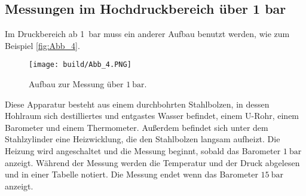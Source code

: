 \subsection{Messungen im Hochdruckbereich über 1 bar} %
\label{sub:M_Hochdruckbereich}
Im Druckbereich ab \qty{1}{\bar} muss ein anderer Aufbau benutzt werden, wie zum Beispiel \autoref{fig:Abb_4}.
\begin{figure}[H]
    \centering
    \texttt{[image: build/Abb\_4.PNG]}
    \caption {Aufbau zur Messung über $\qty{1}{\bar}$.\cite{V203}}
    \label{fig:Abb_4}
\end{figure}
Diese Apparatur besteht aus einem durchbohrten Stahlbolzen, in dessen Hohlraum sich destilliertes und entgastes Wasser befindet,
einem U-Rohr, einem Barometer und einem Thermometer.
Außerdem befindet sich unter dem Stahlzylinder eine Heizwicklung, die den Stahlbolzen langsam aufheizt.
Die Heizung wird angeschaltet und die Messung beginnt, sobald das Barometer $\qty{1}{\bar}$ anzeigt.
Während der Messung werden die Temperatur und der Druck abgelesen und in einer Tabelle notiert.
Die Messung endet wenn das Barometer $\qty{15}{\bar}$ anzeigt.
